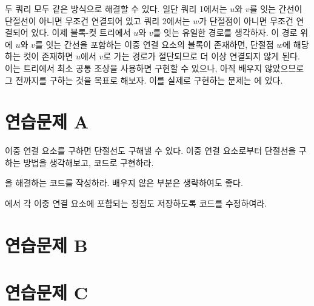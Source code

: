 두 쿼리 모두 같은 방식으로 해결할 수 있다. 일단 쿼리 1에서는 $u$와 $v$를 잇는 간선이 단절선이 아니면 무조건 연결되어 있고 쿼리 2에서는 $w$가 단절점이 아니면 무조건 연결되어 있다.
이제 블록-컷 트리에서 $u$와 $v$를 잇는 유일한 경로를 생각하자. 이 경로 위에 $u$와 $v$를 잇는 간선을 포함하는 이중 연결 요소의 블록이 존재하면, 단절점 $w$에 해당하는 컷이 존재하면 $u$에서 $v$로 가는 경로가 절단되므로 더 이상 연결되지 않게 된다. 
이는 트리에서 최소 공통 조상을 사용하면 구현할 수 있으나, 아직 배우지 않았으므로 그 전까지를 구하는 것을 목표로 해보자. 이를 실제로 구현하는 문제는 에 있다.

\section{연습문제 A}
\begin{problem}
    이중 연결 요소를 구하면 단절선도 구해낼 수 있다. 이중 연결 요소로부터 단절선을 구하는 방법을 생각해보고, 코드로 구현하라.
\end{problem}
\begin{problem} \label{pb: block-cut}
    을 해결하는 코드를 작성하라. 배우지 않은 부분은 생략하여도 좋다.
\end{problem}
\begin{problem}
    에서 각 이중 연결 요소에 포함되는 정점도 저장하도록 코드를 수정하여라.
\end{problem}

\section{연습문제 B}

\section{연습문제 C}